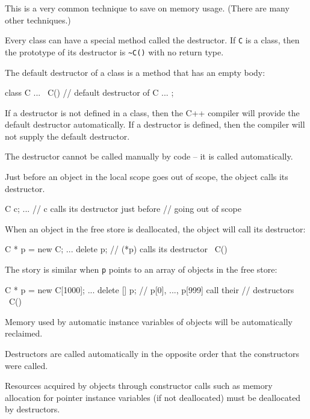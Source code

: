 This is a very common technique to save on memory usage. (There are many
other techniques.)


\newpage{}

Every class can have a special method called the destructor. If \texttt{C}
is a class, then the prototype of its destructor is
\texttt{\~{}C()} with no return type.

The default destructor of a class is a method that has an empty body:

\begin{consolethree}[escapeinside=||]
class C
{
    ...
    ~C(){} // default destructor of C
    ...
};
\end{consolethree}

If a destructor is not defined in a class, then the C++ compiler will
provide the default destructor automatically. If a destructor is
defined, then the compiler will not supply the default destructor.

The destructor cannot be called manually by code -- it is called
automatically.

Just before an object in the local scope goes out of scope, the object
calls its destructor.

\begin{consolethree}[escapeinside=||]
{
    C c;
    ...
    // c calls its destructor just before
    // going out of scope
}
\end{consolethree}

When an object in the free store is deallocated, the object will call
its destructor:

\begin{consolethree}[escapeinside=||]
{
    C * p = new C;
    ...
    delete p; // (*p) calls its destructor ~C()
}
\end{consolethree}

The story is similar when \texttt{p} points to an array of objects in the
free store:

\begin{consolethree}[escapeinside=||]
{
    C * p = new C[1000];
    ...
    delete [] p; // p[0], ..., p[999] call their
                 // destructors ~C()
}
\end{consolethree}

Memory used by automatic instance variables of objects will be
automatically reclaimed.

Destructors are called automatically in the opposite order that the
constructors were called.

Resources acquired by objects through constructor calls such as memory
allocation for pointer instance variables (if not deallocated) must be
deallocated by destructors.


